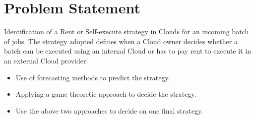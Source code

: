 \section{Problem Statement}
Identification of a Rent or Self-execute strategy in Clouds for an incoming batch of jobs. The strategy adopted defines when a Cloud owner decides whether a batch can be executed using an internal Cloud or has to pay rent to execute it in an external Cloud provider.
\begin{itemize}
\item Use of forecasting methods to predict the strategy. 
\item Applying a game theoretic approach to decide the strategy.
\item Use the above two approaches to decide on one final strategy.
\end{itemize}

